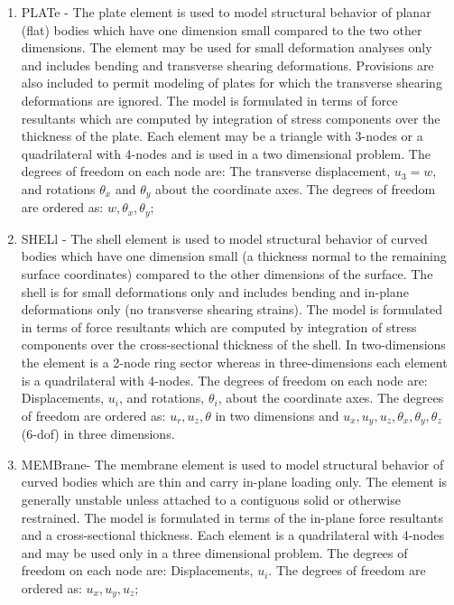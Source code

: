 \begin{enumerate}
\item
PLATe - The plate element is used to model structural behavior of planar (flat)
bodies which have one dimension small compared to the two other dimensions.
The element may be used for small deformation analyses only and
includes bending and transverse shearing deformations.
Provisions are also included to permit modeling of plates for which the
transverse shearing deformations are ignored.  The model is formulated in
terms of force resultants which are computed by integration of stress components
over the thickness of the plate.
Each element may be a triangle with 3-nodes or a quadrilateral
with 4-nodes and is used in a two dimensional
problem.  The degrees of freedom on each node are: The transverse displacement,
$u_3 = w$, and rotations $\theta_x$ and $\theta_y$ about the coordinate axes.
The degrees of freedom are ordered as: $w , \theta_x , \theta_y$;

\item
SHELl - The shell element is used to model structural behavior of curved
bodies which have one dimension small (a thickness normal to
the remaining surface coordinates) compared to the other dimensions of
the surface.  The shell is for small deformations only and includes bending and
in-plane deformations only (no transverse shearing strains).
The model is formulated in
terms of force resultants which are computed by integration of stress components
over the cross-sectional thickness of the shell.
In two-dimensions the element is a 2-node ring sector whereas in
three-dimensions each element is a quadrilateral with 4-nodes.
The degrees of freedom on each node are: Displacements,
$u_i$, and rotations, $\theta_i$, about the coordinate axes.
The degrees of freedom are ordered as:
$u_r , u_z , \theta$ in two dimensions and
$u_x , u_y , u_z , \theta_x , \theta_y , \theta_z$ (6-dof) in three dimensions.

\item
MEMBrane- The membrane element is used to model structural behavior
of curved bodies which are thin and carry in-plane loading
only.  The element is generally unstable unless attached to a
contiguous solid or otherwise restrained.  The model is formulated in
terms of the in-plane force resultants and a cross-sectional thickness.
Each element is a quadrilateral with 4-nodes
and may be used only in a three dimensional
problem.  The degrees of freedom on each node are: Displacements,
$u_i$.  The degrees of freedom are ordered as:
$u_x , u_y , u_z $;


\end{enumerate}
